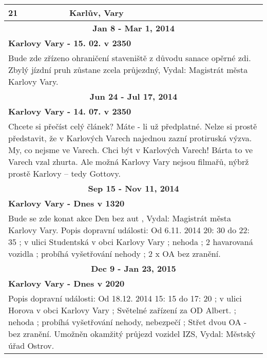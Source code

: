 \begin{tabularx}{\linewidth}{l l}
            \bf 21 & \bf Karlův, Vary \\ \midrule
            
                \multicolumn{2}{c}{\bf Jan 8 - Mar 1, 2014} \\
                \multicolumn{2}{p{\linewidth}}{\bf Karlovy Vary - 15. 02. v 2350} \\
                \multicolumn{2}{p{\linewidth}}{Bude zde zřízeno ohraničení staveniště z důvodu sanace opěrné zdi. Zbylý jízdní pruh zůstane zcela průjezdný, Vydal: Magistrát města Karlovy Vary.} \\ \midrule
                
                \multicolumn{2}{c}{\bf Jun 24 - Jul 17, 2014} \\
                \multicolumn{2}{p{\linewidth}}{\bf Karlovy Vary - 14. 07. v 2350} \\
                \multicolumn{2}{p{\linewidth}}{Chcete si přečíst celý článek? Máte - li už předplatné. Nelze si prostě představit, že v Karlových Varech najednou zazní protiruská výzva. My, co nejsme ve Varech. Chci být v Karlových Varech! Bárta to ve Varech vzal zhurta. Ale možná Karlovy Vary nejsou filmařů, nýbrž prostě Karlovy – tedy Gottovy.} \\ \midrule
                
                \multicolumn{2}{c}{\bf Sep 15 - Nov 11, 2014} \\
                \multicolumn{2}{p{\linewidth}}{\bf Karlovy Vary - Dnes v 1320} \\
                \multicolumn{2}{p{\linewidth}}{Bude se zde konat akce  Den bez aut , Vydal: Magistrát města Karlovy Vary. Popis dopravní události: Od 6.11. 2014 20: 30 do 22: 35 ; v ulici Studentská v obci Karlovy Vary ; nehoda ; 2 havarovaná vozidla ; probíhá vyšetřování nehody ; 2 x OA bez zranění.} \\ \midrule
                
                \multicolumn{2}{c}{\bf Dec 9 - Jan 23, 2015} \\
                \multicolumn{2}{p{\linewidth}}{\bf Karlovy Vary - Dnes v 2020} \\
                \multicolumn{2}{p{\linewidth}}{Popis dopravní události: Od 18.12. 2014 15: 15 do 17: 20 ; v ulici Horova v obci Karlovy Vary ; Světelné zařízení za OD Albert. ; nehoda ; probíhá vyšetřování nehody, nebezpečí ; Střet dvou OA - bez zranění. Umožněn okamžitý průjezd vozidel IZS, Vydal: Městský úřad Ostrov.} \\ \midrule
                [1.5pt]


\end{tabularx}
